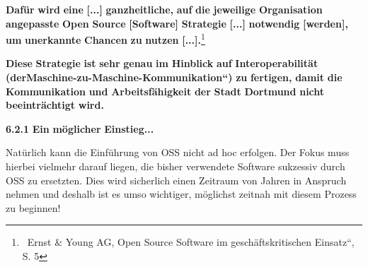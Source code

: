 \documentclass[a4paper]{article}
\begin{document}
{
\textbf{Daf\"ur}\textbf{ }\textbf{wird}\textbf{ }\textbf{eine}\textbf{
}{\guillemotright}\textbf{ }\textbf{[...]}\textbf{
}\textbf{ganzheitliche,}\textbf{ }\textbf{auf}\textbf{
}\textbf{die}\textbf{ }\textbf{jeweilige}\textbf{
}\textbf{Organisation}\textbf{ }\textbf{angepasste}\textbf{
}\textbf{Open}\textbf{ }\textbf{Source}\textbf{
}\textbf{[Software]}\textbf{ }\textbf{Strategie}\textbf{
}\textbf{[...]}\textbf{ }\textbf{notwendig}\textbf{
}\textbf{[werden],}\textbf{ }\textbf{um}\textbf{
}\textbf{unerkannte}\textbf{ }\textbf{Chancen}\textbf{
}\textbf{zu}\textbf{ }\textbf{nutzen}\textbf{
}\textbf{[...].}{\guillemotleft}\footnote{\ Ernst \& Young AG,
{\quotedblbase}Open Source Software im gesch\"aftskritischen
Einsatz{\textquotedblleft}, S. 5}}

{
\textbf{Diese}\textbf{ }\textbf{Strategie}\textbf{ }\textbf{ist}\textbf{
}\textbf{sehr}\textbf{ }\textbf{genau}\textbf{ }\textbf{im}\textbf{
}\textbf{Hinblick}\textbf{ }\textbf{auf}\textbf{
}\textbf{Interoperabilit\"at}\textbf{ }\textbf{(}\textbf{der}\textbf{
{\quotedblbase}}\textbf{Maschine-zu-Maschine-Kommunikation{\textquotedblleft})}\textbf{
}\textbf{zu}\textbf{ }\textbf{fertigen,}\textbf{
}\textbf{damit}\textbf{ }\textbf{die}\textbf{
}\textbf{Kommunikation}\textbf{ }\textbf{und}\textbf{
}\textbf{Arbeitsf\"ahigkeit}\textbf{ }\textbf{der}\textbf{
}\textbf{Stadt}\textbf{ }\textbf{Dortmund}\textbf{
}\textbf{nicht}\textbf{ }\textbf{beeintr\"achtigt}\textbf{
}\textbf{wird.}}


\bigskip


\bigskip

{
\hypertarget{EinmglicherEinstieg}{}\textbf{6.2.1}\textbf{
}\textbf{Ein}\textbf{ }\textbf{m\"oglicher}\textbf{
}\textbf{Einstieg...}}


\bigskip

{
Nat\"urlich kann die Einf\"uhrung von OSS nicht ad hoc erfolgen. Der
Fokus muss hierbei vielmehr darauf liegen, die bisher verwendete
Software sukzessiv durch OSS zu ersetzten. Dies wird sicherlich einen
Zeitraum von Jahren in Anspruch nehmen und deshalb ist es umso
wichtiger, m\"oglichst zeitnah mit diesem Prozess zu beginnen!}
\end{document}
